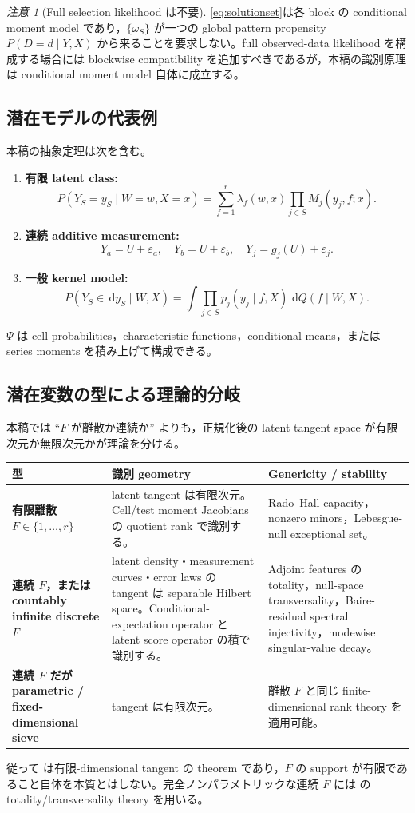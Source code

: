 \documentclass[11pt,a4paper]{ltjsarticle}
\theoremstyle{remark}
\newtheorem{remark}{注意}[section]
\newcommand{\dd}{\,\mathrm d}
\begin{document}
\begin{remark}[Full selection likelihood は不要]
\eqref{eq:solutionset}は各 block の conditional moment model であり，$\{\omega_S\}$ が一つの global pattern propensity $P(D=d\mid Y,X)$ から来ることを要求しない。full observed-data likelihood を構成する場合には blockwise compatibility を追加すべきであるが，本稿の識別原理は conditional moment model 自体に成立する。
\end{remark}

\subsection{潜在モデルの代表例}
本稿の抽象定理は次を含む。
\begin{enumerate}[label=(\roman*)]
\item \textbf{有限 latent class:}
\[
P(Y_S=y_S\mid W=w,X=x)
=\sum_{f=1}^r\lambda_f(w,x)\prod_{j\in S}M_j(y_j,f;x).
\]
\item \textbf{連続 additive measurement:}
\[
Y_a=U+\varepsilon_a,\quad Y_b=U+\varepsilon_b,
\quad Y_j=g_j(U)+\varepsilon_j.
\]
\item \textbf{一般 kernel model:}
\[
P(Y_S\in\dd y_S\mid W,X)
=\int\prod_{j\in S}p_j(y_j\mid f,X)\,\dd Q(f\mid W,X).
\]
\end{enumerate}
$\Psi$ は cell probabilities，characteristic functions，conditional means，または series moments を積み上げて構成できる。


\subsection{潜在変数の型による理論的分岐}\label{subsec:latenttypes}
本稿では ``$F$ が離散か連続か'' よりも，正規化後の latent tangent space が有限次元か無限次元かが理論を分ける。
\begin{center}
\begin{tabularx}{0.97\textwidth}{>{\bfseries}p{30mm}X X}
\toprule
型 & 識別 geometry & Genericity / stability \\
\midrule
有限離散 $F\in\{1,\ldots,r\}$
& latent tangent は有限次元。Cell/test moment Jacobians の quotient rank で識別する。
& Rado--Hall capacity，nonzero minors，Lebesgue-null exceptional set。\\
連続 $F$，または countably infinite discrete $F$
& latent density・measurement curves・error laws の tangent は separable Hilbert space。Conditional-expectation operator と latent score operator の積で識別する。
& Adjoint features の totality，null-space transversality，Baire-residual spectral injectivity，modewise singular-value decay。\\
連続 $F$ だが parametric / fixed-dimensional sieve
& tangent は有限次元。
& 離散 $F$ と同じ finite-dimensional rank theory を適用可能。\\
\bottomrule
\end{tabularx}
\end{center}
従って  は有限-dimensional tangent の theorem であり，$F$ の support が有限であること自体を本質とはしない。完全ノンパラメトリックな連続 $F$ には  の totality/transversality theory を用いる。
\end{document}
